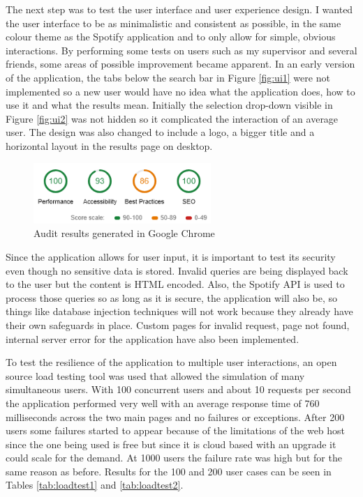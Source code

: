 The next step was to test the user interface and user experience design. I wanted the user interface to be as minimalistic and consistent as possible, in the same colour theme as the Spotify application and to only allow for simple, obvious interactions. By performing some tests on users such as my supervisor and several friends, some areas of possible improvement became apparent. In an early version of the application, the tabs below the search bar in Figure \ref{fig:ui1} were not implemented so a new user would have no idea what the application does, how to use it and what the results mean. Initially the selection drop-down visible in Figure \ref{fig:ui2} was not hidden so it complicated the interaction of an average user. The design was also changed to include a logo, a bigger title and a horizontal layout in the results page on desktop.

\begin{figure}[h]
\centering
\includegraphics[width=0.6\textwidth]{web_application/fig/audit1.PNG} %
\caption{Audit results generated in Google Chrome}
\label{fig:audit1}
\end{figure}

Since the application allows for user input, it is important to test its security even though no sensitive data is stored. Invalid queries are being displayed back to the user but the content is HTML encoded. Also, the Spotify API is used to process those queries so as long as it is secure, the application will also be, so things like database injection techniques will not work because they already have their own safeguards in place. Custom pages for invalid request, page not found, internal server error for the application have also been implemented.

To test the resilience of the application to multiple user interactions, an open source load testing tool \cite{LocustTest:online} was used that allowed the simulation of many simultaneous users. With 100 concurrent users and about 10 requests per second the application performed very well with an average response time of 760 milliseconds across the two main pages and no failures or exceptions. After 200 users some failures started to appear because of the limitations of the web host since the one being used is free but since it is cloud based with an upgrade it could scale for the demand. At 1000 users the failure rate was high but for the same reason as before. Results for the 100 and 200 user cases can be seen in Tables \ref{tab:loadtest1} and \ref{tab:loadtest2}. 


